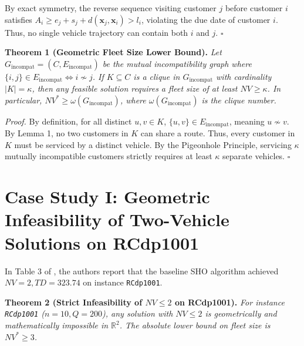 \documentclass[review]{elsarticle}
\begin{document}
By exact symmetry, the reverse sequence visiting customer $j$ before customer $i$ satisfies $A_i \ge e_j + s_j + d(\mathbf{x}_j, \mathbf{x}_i) > l_i$, violating the due date of customer $i$. Thus, no single vehicle trajectory can contain both $i$ and $j$. \hfill $\square$

\vspace{0.25cm}
\noindent\textbf{Theorem 1 (Geometric Fleet Size Lower Bound).}
\textit{Let $G_{\text{incompat}} = (C, E_{\text{incompat}})$ be the mutual incompatibility graph where $\{i, j\} \in E_{\text{incompat}} \iff i \nsim j$. If $K \subseteq C$ is a clique in $G_{\text{incompat}}$ with cardinality $|K| = \kappa$, then any feasible solution requires a fleet size of at least $NV \ge \kappa$. In particular, $NV^* \ge \omega(G_{\text{incompat}})$, where $\omega(G_{\text{incompat}})$ is the clique number.}

\vspace{0.15cm}
\noindent\textit{Proof.}
By definition, for all distinct $u, v \in K$, $\{u, v\} \in E_{\text{incompat}}$, meaning $u \nsim v$. By Lemma 1, no two customers in $K$ can share a route. Thus, every customer in $K$ must be serviced by a distinct vehicle. By the Pigeonhole Principle, servicing $\kappa$ mutually incompatible customers strictly requires at least $\kappa$ separate vehicles. \hfill $\square$

\section{Case Study I: Geometric Infeasibility of Two-Vehicle Solutions on RCdp1001}
\label{sec:rcdp1001}
In Table 3 of \cite{nguyen2026phshowoa}, the authors report that the baseline SHO algorithm achieved $NV = 2, TD = 323.74$ on instance \texttt{RCdp1001}.

\vspace{0.25cm}
\noindent\textbf{Theorem 2 (Strict Infeasibility of $NV \le 2$ on RCdp1001).}
\textit{For instance \texttt{RCdp1001} ($n=10, Q=200$), any solution with $NV \le 2$ is geometrically and mathematically impossible in $\mathbb{R}^2$. The absolute lower bound on fleet size is $NV^* \ge 3$.}
\end{document}

